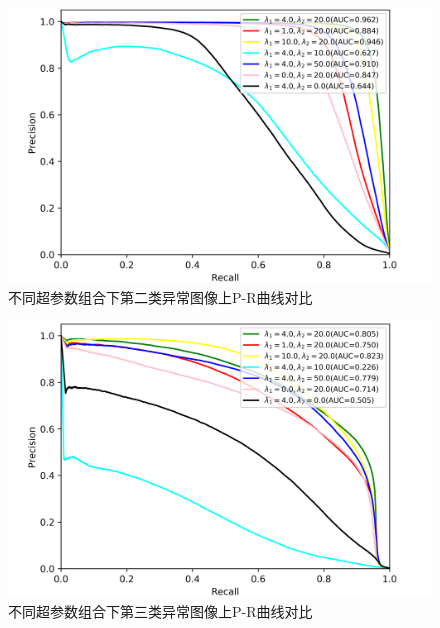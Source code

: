 \begin{figure}[H]
	\centering
	\includegraphics[width=1.0\textwidth]{figure/pr_curve_multi_skin_hyper_paras/SKIN_pr_curve.png}
	\caption{不同超参数组合下第二类异常图像上P-R曲线对比}
	\label{fig:multi_simulate_pr_curve_skin_hyper_paras}
\end{figure}
\begin{figure}[H]
	\centering
	\includegraphics[width=1.0\textwidth]{figure/pr_curve_multi_skin_hyper_paras/CIRCLE_pr_curve.png}
	\caption{不同超参数组合下第三类异常图像上P-R曲线对比} 
	\label{fig:multi_simulate_pr_curve_circle_hyper_paras}
\end{figure}

